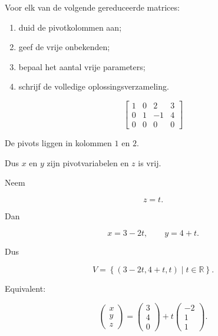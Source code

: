\documentclass{ximera}
\begin{document}

\begin{oefening}{\oefB\ESS}

Voor elk van de volgende gereduceerde matrices:

\begin{enumerate}
    \item duid de pivotkolommen aan;
    \item geef de vrije onbekenden;
    \item bepaal het aantal vrije parameters;
    \item schrijf de volledige oplossingsverzameling.
\end{enumerate}


\begin{question}

\[
\left[
\begin{array}{ccc|c}
1&0&2&3\\
0&1&-1&4\\
0&0&0&0
\end{array}
\right]
\]

\begin{oplossing}

De pivots liggen in kolommen \(1\) en \(2\).

Dus \(x\) en \(y\) zijn pivotvariabelen en \(z\) is vrij.

Neem

\[
z=t.
\]

Dan

\[
x=3-2t,
\qquad
y=4+t.
\]

Dus

\[
V=
\left\{
(3-2t,4+t,t)
\mid t\in\mathbb{R}
\right\}.
\]

Equivalent:

\[
\begin{pmatrix}
x\\y\\z
\end{pmatrix}
=
\begin{pmatrix}
3\\4\\0
\end{pmatrix}
+
t
\begin{pmatrix}
-2\\1\\1
\end{pmatrix}.
\]


\end{oplossing}
\end{question}
\end{oefening}
\end{document}
